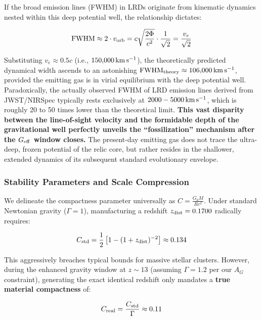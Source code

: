 \documentclass[twocolumn]{aastex631}
\begin{document}
If the broad emission lines (FWHM) in LRDs originate from kinematic dynamics nested within this deep potential well, the relationship dictates:

\begin{equation}
    {\rm FWHM} \approx 2 \cdot v_{\rm orb} = c \sqrt{\frac{2\Phi}{c^2}} \cdot \frac{1}{\sqrt{2}} = \frac{v_e}{\sqrt{2}}
    \label{eq:fwhm}
\end{equation}

Substituting $v_e \approx 0.5c$ (i.e., $150{,}000 \rm\, km\, s^{-1}$), the theoretically predicted dynamical width ascends to an astonishing ${\rm FWHM}_{\rm theory} \approx 106{,}000 \rm\, km\, s^{-1}$, provided the emitting gas is in virial equilibrium with the deep potential well. Paradoxically, the actually observed FWHM of LRD emission lines derived from JWST/NIRSpec typically rests exclusively at $2000-5000 \rm\, km\, s^{-1}$, which is roughly 20 to 50 times lower than the theoretical limit. \textbf{This vast disparity between the line-of-sight velocity and the formidable depth of the gravitational well perfectly unveils the ``fossilization'' mechanism after the $G_{\rm eff}$ window closes.} The present-day emitting gas does not trace the ultra-deep, frozen potential of the relic core, but rather resides in the shallower, extended dynamics of its subsequent standard evolutionary envelope.

\subsubsection{Stability Parameters and Scale Compression}
We delineate the compactness parameter universally as $C = \frac{G_0 M}{Rc^2}$. Under standard Newtonian gravity ($\Gamma=1$), manufacturing a redshift $z_{\rm dist}=0.1700$ radically requires:

\begin{equation}
    C_{\rm std} = \frac{1}{2} \left[ 1 - (1+z_{\rm dist})^{-2} \right] \approx 0.134
\end{equation}

This aggressively breaches typical bounds for massive stellar clusters. However, during the enhanced gravity window at $z \sim 13$ (assuming $\Gamma = 1.2$ per our $A_G$ constraint), generating the exact identical redshift only mandates a \textbf{true material compactness} of:

\begin{equation}
    C_{\rm real} = \frac{C_{\rm std}}{\Gamma} \approx 0.11
\end{equation}
\end{document}
